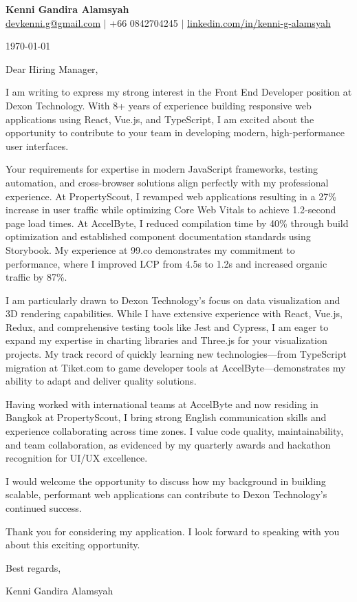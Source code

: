 \documentclass[11pt]{article}
\begin{document}
\begin{center}
  \textbf{\Large Kenni Gandira Alamsyah}\\
  \vspace{0.5em}
  \href{mailto:devkenni.g@gmail.com}{devkenni.g@gmail.com} $|$ +66 0842704245 $|$ \href{https://www.linkedin.com/in/kenni-g-alamsyah/}{linkedin.com/in/kenni-g-alamsyah}
\end{center}

\vspace{1em}

\today

\vspace{1em}

Dear Hiring Manager,

I am writing to express my strong interest in the Front End Developer position at Dexon Technology. With 8+ years of experience building responsive web applications using React, Vue.js, and TypeScript, I am excited about the opportunity to contribute to your team in developing modern, high-performance user interfaces.

Your requirements for expertise in modern JavaScript frameworks, testing automation, and cross-browser solutions align perfectly with my professional experience. At PropertyScout, I revamped web applications resulting in a 27\% increase in user traffic while optimizing Core Web Vitals to achieve 1.2-second page load times. At AccelByte, I reduced compilation time by 40\% through build optimization and established component documentation standards using Storybook. My experience at 99.co demonstrates my commitment to performance, where I improved LCP from 4.5s to 1.2s and increased organic traffic by 87\%.

I am particularly drawn to Dexon Technology's focus on data visualization and 3D rendering capabilities. While I have extensive experience with React, Vue.js, Redux, and comprehensive testing tools like Jest and Cypress, I am eager to expand my expertise in charting libraries and Three.js for your visualization projects. My track record of quickly learning new technologies---from TypeScript migration at Tiket.com to game developer tools at AccelByte---demonstrates my ability to adapt and deliver quality solutions.

Having worked with international teams at AccelByte and now residing in Bangkok at PropertyScout, I bring strong English communication skills and experience collaborating across time zones. I value code quality, maintainability, and team collaboration, as evidenced by my quarterly awards and hackathon recognition for UI/UX excellence.

I would welcome the opportunity to discuss how my background in building scalable, performant web applications can contribute to Dexon Technology's continued success.

Thank you for considering my application. I look forward to speaking with you about this exciting opportunity.

\vspace{1em}

Best regards,

\vspace{1em}

Kenni Gandira Alamsyah
\end{document}
